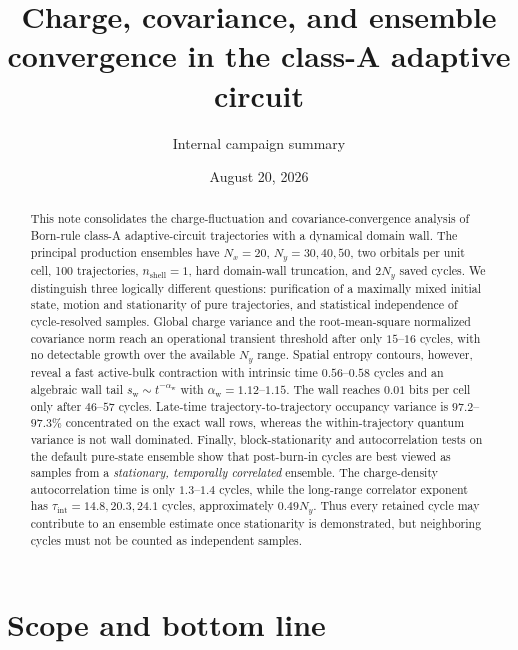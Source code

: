 \documentclass[aps,prb,twocolumn,nofootinbib,superscriptaddress,floatfix]{revtex4-2}
\begin{document}
\title{Charge, covariance, and ensemble convergence in the class-A adaptive circuit}
\author{Internal campaign summary}
\date{August 20, 2026}

\begin{abstract}
This note consolidates the charge-fluctuation and covariance-convergence
analysis of Born-rule class-A adaptive-circuit trajectories with a dynamical
domain wall.  The principal production ensembles have
$N_x=20$, $N_y=30,40,50$, two orbitals per unit cell, 100 trajectories,
$n_{\mathrm{shell}}=1$, hard domain-wall truncation, and $2N_y$ saved cycles.
We distinguish three logically different questions: purification of a
maximally mixed initial state, motion and stationarity of pure trajectories,
and statistical independence of cycle-resolved samples.  Global charge
variance and the root-mean-square normalized covariance norm reach an
operational transient threshold after only $15$--$16$ cycles, with no
detectable growth over the available $N_y$ range.  Spatial entropy contours,
however, reveal a fast active-bulk contraction with intrinsic time
$0.56$--$0.58$ cycles and an algebraic wall tail
$s_{\mathrm w}\sim t^{-\alpha_{\mathrm w}}$ with
$\alpha_{\mathrm w}=1.12$--$1.15$.  The wall reaches
$0.01$ bits per cell only after $46$--$57$ cycles.  Late-time
trajectory-to-trajectory occupancy variance is $97.2$--$97.3\%$ concentrated
on the exact wall rows, whereas the within-trajectory quantum variance is
not wall dominated.  Finally, block-stationarity and autocorrelation tests on
the default pure-state ensemble show that post-burn-in cycles are best viewed
as samples from a \emph{stationary, temporally correlated} ensemble.  The
charge-density autocorrelation time is only $1.3$--$1.4$ cycles, while the
long-range correlator exponent has $\tau_{\mathrm{int}}=14.8,20.3,24.1$
cycles, approximately $0.49N_y$.  Thus every retained cycle may contribute to
an ensemble estimate once stationarity is demonstrated, but neighboring cycles
must not be counted as independent samples.
\end{abstract}

\maketitle
\setcounter{tocdepth}{2}
\tableofcontents

\section{Scope and bottom line}
\label{sec:scope}
\end{document}

